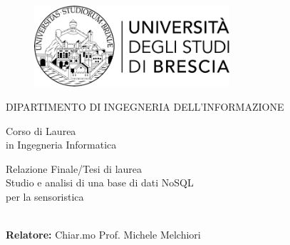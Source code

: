 \begin{titlepage}
    \begin{center}

        \begin{figure}[t]
            \centering
            \includegraphics[width=72.4mm,height=30mm]{img/logo_unibs}
        \end{figure}

        \vspace*{10mm}

        {\fontsize{17}{17}\selectfont
        DIPARTIMENTO DI INGEGNERIA DELL'INFORMAZIONE\\
        }

        \vspace*{10mm}

        {\fontsize{17}{17}\selectfont
        Corso di Laurea\\
        in Ingegneria Informatica\\

        }

        \vspace*{20mm}

        {\fontsize{20}{20}\selectfont
        Relazione Finale/Tesi di laurea\\
        Studio e analisi di una base di dati NoSQL\\
        per la sensoristica\\
        \\
        }

    \end{center}

    \vfill

    \begin{flushleft}
    {\fontsize{17}{17}\selectfont
    \textbf{Relatore:} Chiar.mo Prof. Michele Melchiori
    }

    \end{flushleft}


\end{titlepage}
